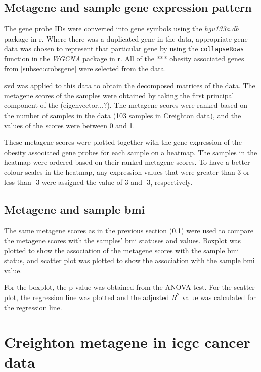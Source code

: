 \subsection{Metagene and sample gene expression pattern}
\label{subsec:crmetage}

The gene probe IDs were converted into gene symbols using the \textit{hgu133a.db} package in \gls{r}.
Where there was a duplicated gene in the data, appropriate gene data was chosen to represent that particular gene by using the \texttt{collapseRows} function in the \textit{WGCNA} package in \gls{r}.
All of the *** obesity associated genes from  \cref{subsec:crobsgene} were selected from the data.

\gls{svd} was applied to this data to obtain the decomposed matrices of the data.
The \gls{metagene} scores of the samples were obtained by taking the first principal component of the (eigenvector...?).
The \gls{metagene} scores were ranked based on the number of samples in the data (103 samples in Creighton data), and the values of the scores were between 0 and 1.

These \gls{metagene} scores were plotted together with the gene expression of the obesity associated gene probes for each sample on a heatmap.
The samples in the heatmap were ordered based on their ranked \gls{metagene} scores.
To have a better colour scales in the heatmap, any expression values that were greater than 3 or less than -3 were assigned the value of 3 and -3, respectively.

\subsection{Metagene and sample \gls{bmi}}
\label{subsec:crmetabmi}

The same \gls{metagene} scores as in the previous section (\cref{subsec:crmetage}) were used to compare the \gls{metagene} scores with the samples' \gls{bmi} statuses and values.
Boxplot was plotted to show the association of the \gls{metagene} scores with the sample \gls{bmi} status, and scatter plot was plotted to show the association with the sample \gls{bmi} value.

For the boxplot, the p-value was obtained from the ANOVA test.
For the scatter plot, the regression line was plotted and the adjusted $R^2$ value was calculated for the regression line.


\section{Creighton metagene in \gls{icgc} cancer data}
\label{sec:crmetaicgc}

